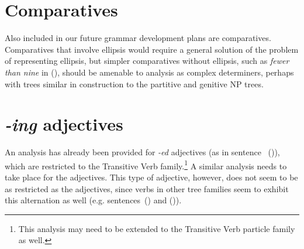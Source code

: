 \section{Comparatives}

Also included in our future grammar development plans are comparatives.
Comparatives that involve ellipsis would require a general solution of the
problem of representing ellipsis, but simpler comparatives without ellipsis,
such as {\it fewer than nine\/} in (), should be amenable to analysis as
complex determiners, perhaps with trees similar in construction to the
partitive and genitive NP trees.









\section{{\it -ing} adjectives}

An analysis has already been provided for {\it -ed} adjectives (as in sentence~
()), which are restricted to the Transitive Verb family.\footnote{This
analysis may need to be extended to the Transitive Verb particle family as
well.}  A similar analysis needs to take place for the  adjectives.  This type of adjective, however, does not seem to be as
restricted as the  adjectives, since verbs in other
tree families seem to exhibit this alternation as well (e.g. sentences~()
and ()).

